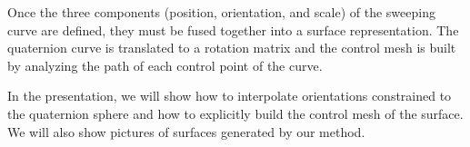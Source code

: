Once the three components (position, orientation, and scale) of the sweeping
curve are defined, they must be fused together into a surface representation.
The quaternion curve is translated to a rotation matrix 
and the control mesh is built by analyzing the
path of each control point of the curve.

In the presentation, 
we will show how to interpolate orientations constrained to the quaternion sphere
and how to explicitly build the control mesh of the surface.
We will also show pictures of surfaces generated by our method.



